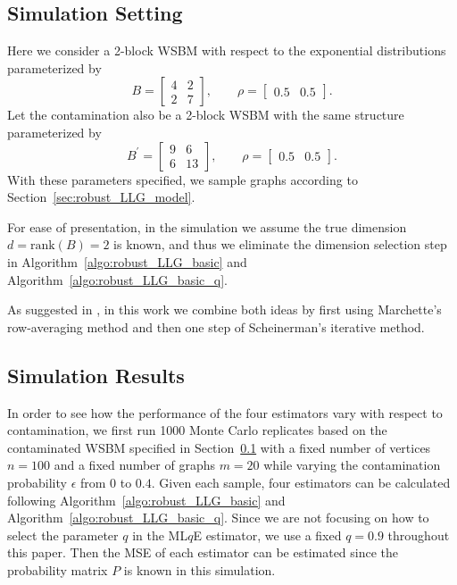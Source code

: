 \subsection{Simulation Setting}
\label{sec:sim_setting}
Here we consider a 2-block WSBM with respect to the exponential distributions parameterized by
\begin{equation*}
B = \begin{bmatrix}
4 & 2 \\
2 & 7
\end{bmatrix}
,\qquad \rho = \begin{bmatrix}
0.5 & 0.5
\end{bmatrix}.
\end{equation*}
Let the contamination also be a 2-block WSBM with the same structure parameterized by
\begin{equation*}
B^{\prime} = \begin{bmatrix}
9 & 6 \\
6 & 13
\end{bmatrix}
,\qquad \rho = \begin{bmatrix}
0.5 & 0.5
\end{bmatrix}.
\end{equation*}
With these parameters specified, we sample graphs according to Section~\ref{sec:robust_LLG_model}.

For ease of presentation, in the simulation we assume the true dimension $d = \mathrm{rank}(B) = 2$ is known, and thus we eliminate the dimension selection step in Algorithm~\ref{algo:robust_LLG_basic} and Algorithm~\ref{algo:robust_LLG_basic_q}.

As suggested in \citep{tang2016law}, in this work we combine both ideas by first using Marchette's row-averaging method and then one step of Scheinerman's iterative method.



\subsection{Simulation Results}

In order to see how the performance of the four estimators vary with respect to contamination, we first run 1000 Monte Carlo replicates based on the contaminated WSBM specified in Section~\ref{sec:sim_setting} with a fixed number of vertices $n = 100$ and a fixed number of graphs $m = 20$ while varying the contamination probability $\epsilon$ from $0$ to $0.4$.
Given each sample, four estimators can be calculated following Algorithm~\ref{algo:robust_LLG_basic} and Algorithm~\ref{algo:robust_LLG_basic_q}. Since we are not focusing on how to select the parameter $q$ in the ML$q$E estimator, we use a fixed $q = 0.9$ throughout this paper. Then the MSE of each estimator can be estimated since the probability matrix $P$ is known in this simulation.

